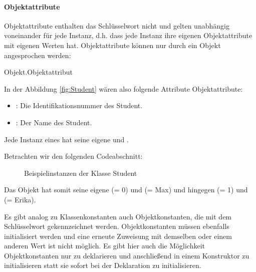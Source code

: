 \documentclass{tuda-pub}
\begin{document}
  \clearpage

  \paragraph{Objektattribute}

  Objektattribute enthalten das Schlüsselwort  nicht und gelten unabhängig
  voneinander für jede Instanz, d.h. dass jede Instanz ihre eigenen Objektattribute mit eigenen
  Werten hat. Objektattribute können nur durch ein Objekt angesprochen werden:

  \begin{center}
    Objekt.Objektattribut
  \end{center}

  In der Abbildung \ref{fig:Student} wären also folgende Attribute Objektattribute:

  \begin{itemize}
    \item {}: Die Identifikationsnummer des Student.
    \item {}: Der Name des Student.
  \end{itemize}

  Jede Instanz eines  hat seine eigene  und .

  \br

  Betrachten wir den folgenden Codeabschnitt:

  \begin{figure}[h]
    \centering
    
    \caption{Beispielinstanzen der Klasse Student}
  \end{figure}

  Das Objekt  hat somit seine eigene  (= 0) und 
  (= Max) und  hingegen  (= 1) und  (= Erika).

  \br

  Es gibt analog zu Klassenkonstanten auch Objektkonstanten, die mit dem Schlüsselwort
   gekennzeichnet werden. Objektkonstanten müssen ebenfalls initialisiert
  werden und eine erneute Zuweisung mit demselben oder einem anderen Wert ist nicht möglich. Es
  gibt hier auch die Möglichkeit Objektkonstanten nur zu deklarieren und anschließend in einem
  Konstruktor zu initialisieren statt sie sofort bei der Deklaration zu initialisieren.
\end{document}
